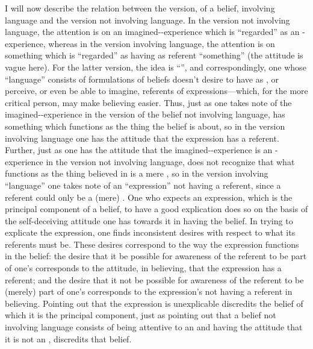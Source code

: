  I will now describe the relation between the 
version, of a belief, involving language and the version not involving 
language. In the version not involving language, the attention is on an 
imagined-\x-experience which is \enquote{regarded} as an \x-experience, whereas in 
the version involving language, the attention is on something which is 
\enquote{regarded} as having as referent \enquote{something} (the attitude is vague here). 
For the latter version, the idea is \enquote{}, and 
correspondingly, one whose \enquote{language} consists of formulations of beliefs 
doesn't desire to have as , or perceive, or even be able to imagine, 
referents of expressions---which, for the more critical person, may make 
believing easier. Thus, just as one takes note of the imagined-\x-experience in 
the version of the belief not involving language, has something which 
functions as the thing the belief is about, so in the version involving language 
one has the attitude that the expression has a referent. Further, just as one 
has the attitude that the imagined-\x-experience is an \x-experience in the 
version not involving language, does not recognize that what functions as the 
thing believed in is a mere , so in the version involving 
\enquote{language} one takes note of an \enquote{expression} not having a referent, since a 
referent could only be a (mere) . One who expects an expression, 
which is the principal component of a belief, to have a good explication does 
so on the basis of the self-deceiving attitude one has towards it in having the 
belief. In trying to explicate the expression, one finds inconsistent desires 
with respect to what its referents must be. These desires correspond to the 
way the expression functions in the belief: the desire that it be possible for 
awareness of the referent to be part of one's  corresponds to the 
attitude, in believing, that the expression has a referent; and the desire that it 
not be possible for awareness of the referent to be (merely) part of one's 
 corresponds to the expression's not having a referent in believing. 
Pointing out that the expression is unexplicable discredits the belief of which 
it is the principal component, just as pointing out that a belief not involving 
language consists of being attentive to an  and having the 
attitude that it is not an , discredits that belief. 

